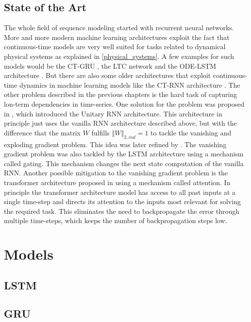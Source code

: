 \documentclass[draft,final]{vutinfth} %
\begin{document}
    \section{State of the Art}
    The whole field of sequence modeling started with recurrent neural networks.
    More and more modern machine learning architectures exploit the fact that continuous-time models are very well suited for tasks related to dynamical physical systems as explained in \ref{physical_systems}.
    A few examples for such models would be the CT-GRU \cite{CTGRU}, the LTC network \cite{LTCNetworks} and the ODE-LSTM architecture \cite{ODELSTM}.
    But there are also some older architectures that exploit continuous-time dynamics in machine learning models like the CT-RNN architecture \cite{CTRNN}.
    The other problem described in the previous chapters is the hard task of capturing lon-term dependencies in time-series.
    One solution for the problem was proposed in \cite{UnitaryRNNs}, which introduced the Unitary RNN architecture.
    This architecture in principle just uses the vanilla RNN architecture described above, but with the difference that the matrix $W$ fulfills $\left\Vert W \right\Vert_{2,ind} = 1$ to tackle the vanishing and exploding gradient problem.
    This idea was later refined by \cite{EfficientUnitaryRNNs}.
    The vanishing gradient problem was also tackled by the LSTM architecture \cite{LSTM} using a mechanism called gating. 
    This mechanism changes the next state computation of the vanilla RNN.
    Another possible mitigation to the vanishing gradient problem is the transformer architecture proposed in \cite{Transformer} using a mechanism called attention.
    In principle the transformer architecture model has access to all past inputs at a single time-step and directs its attention to the inputs most relevant for solving the required task.
    This eliminates the need to backpropagate the error through multiple time-steps, which keeps the number of backpropagation steps low. 
    

    \chapter{Models}

    \section{LSTM}

    \section{GRU}
\end{document}
